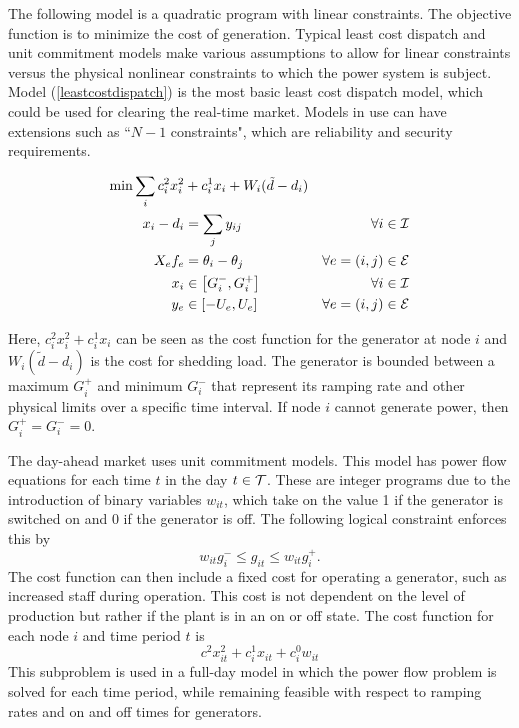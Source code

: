The following model is a quadratic program with linear constraints.  The objective function is to minimize the cost of generation.  Typical least cost dispatch and unit commitment models make various assumptions to allow for linear constraints versus the physical nonlinear constraints to which the power system is subject.  Model (\ref{leastcostdispatch}) is the most basic least cost dispatch model, which could be used for clearing the real-time market.  Models in use can have extensions such as ``$N-1$ constraints", which are reliability and security requirements.

\begin{subequations}
\begin{align}
 \min \sum_i c^2_i x_i^2 &+ c^1_i x_i	+ W_i(\tilde{d} - d_i)&	\\
x_i - d_i &= \sum_j y_{ij}	&	\forall i \in \mathcal{I} 	\\
X_{e} f_{e} &= \theta_i - \theta_j & \forall e=(i,j) \in \mathcal{E} \\
x_i  &\in \left[ G_i^- , G_i^+ \right]		&	\forall i \in \mathcal{I} 	\\
y_{e} &\in \left[ -U_{e}, U_{e} \right]	&	\forall e=(i,j) \in \mathcal{E} 
\end{align}
\label{leastcostdispatch}
\end{subequations}

Here, $c^2_i x_i^2 + c^1_i x_i$ can be seen as the cost function for the generator at node $i$ and $W_i(\tilde{d} - d_i)$ is the cost for shedding load.  The generator is bounded between a maximum $G_i^+$ and minimum $G_i^-$ that represent its ramping rate and other physical limits over a specific time interval.    If node $i$ cannot generate power, then $G_i^+=G_i^-=0$.

The day-ahead market uses unit commitment models.  This model has power flow equations for each time $t$ in the day $t \in \mathcal{T}$.  These are integer programs due to the introduction of binary variables $w_{it}$, which take on the value 1 if the generator is switched on and 0 if the generator is off.  The following logical constraint enforces this by
\begin{equation}
w_{it} g_i^- \le g_{it} \le w_{it} g_i^+.
\end{equation}
The cost function can then include a fixed cost for operating a generator, such as increased staff during operation.  This cost is not dependent on the level of production but rather if the plant is in an on or off state.  The cost function for each node $i$ and time period $t$ is
\begin{equation}
c^2 x_{it}^2 + c^1_i x_{it} + c^0_i w_{it}
\end{equation}
This subproblem is used in a full-day model in which the power flow problem is solved for each time period, while remaining feasible with respect to ramping rates and on and off times for generators.





